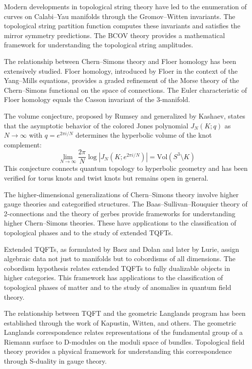 Modern developments in topological string theory have led to the enumeration of curves on Calabi--Yau manifolds through the Gromov--Witten invariants. The topological string partition function computes these invariants and satisfies the mirror symmetry predictions. The BCOV theory provides a mathematical framework for understanding the topological string amplitudes.

The relationship between Chern--Simons theory and Floer homology has been extensively studied. Floer homology, introduced by Floer in the context of the Yang--Mills equations, provides a graded refinement of the Morse theory of the Chern--Simons functional on the space of connections. The Euler characteristic of Floer homology equals the Casson invariant of the 3-manifold.

The volume conjecture, proposed by Rumsey and generalized by Kashaev, states that the asymptotic behavior of the colored Jones polynomial $J_N(K; q)$ as $N \to \infty$ with $q = e^{2\pi i/N}$ determines the hyperbolic volume of the knot complement:
\[
\lim_{N \to \infty} \frac{2\pi}{N} \log |J_N(K; e^{2\pi i/N})| = \text{Vol}(S^3 \setminus K)
\]
This conjecture connects quantum topology to hyperbolic geometry and has been verified for torus knots and twist knots but remains open in general.

The higher-dimensional generalizations of Chern--Simons theory involve higher gauge theories and categorified structures. The Baas--Sullivan--Rouquier theory of 2-connections and the theory of gerbes provide frameworks for understanding higher Chern--Simons theories. These have applications to the classification of topological phases and to the study of extended TQFTs.

Extended TQFTs, as formulated by Baez and Dolan and later by Lurie, assign algebraic data not just to manifolds but to cobordisms of all dimensions. The cobordism hypothesis relates extended TQFTs to fully dualizable objects in higher categories. This framework has applications to the classification of topological phases of matter and to the study of anomalies in quantum field theory.

The relationship between TQFT and the geometric Langlands program has been established through the work of Kapustin, Witten, and others. The geometric Langlands correspondence relates representations of the fundamental group of a Riemann surface to D-modules on the moduli space of bundles. Topological field theory provides a physical framework for understanding this correspondence through S-duality in gauge theory.


